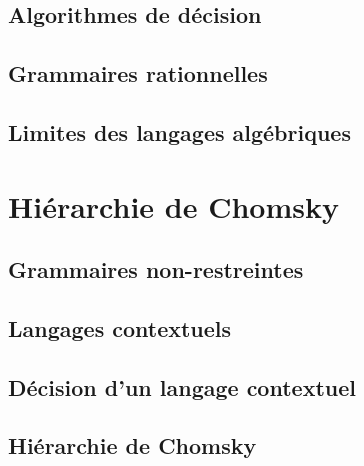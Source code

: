 \subsection{Algorithmes de décision}




 
\subsection{Grammaires rationnelles}







 
\subsection{Limites des langages algébriques}



 
\section{Hiérarchie de Chomsky}
 
\subsection{Grammaires non-restreintes}




 
\subsection{Langages contextuels}



 
\subsection{Décision d'un langage contextuel}



 
\subsection{Hiérarchie de Chomsky}





\endgroup
\endinput
